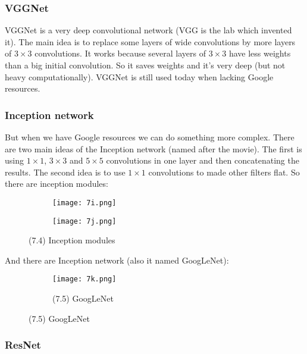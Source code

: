 \subsubsection*{VGGNet}

VGGNet is a very deep convolutional network (VGG is the lab which invented it). The main idea is to replace some layers of wide convolutions by more layers of $3\times3$ convolutions. It works because several layers of $3\times3$ have less weights than a big initial convolution. So it saves weights and it's very deep (but not heavy computationally). VGGNet is still used today when lacking Google resources.

\subsubsection*{Inception network}

But when we have Google resources we can do something more complex. There are two main ideas of the Inception network (named after the movie). The first is using $1\times1$, $3\times3$ and $5\times5$ convolutions in one layer and then concatenating the results. The second idea is to use $1\times1$ convolutions to made other filters flat. So there are inception modules:\\
\begin{figure}[h]
  \centering
  \begin{subfigure}[l]{0.4\linewidth}
    \texttt{[image: 7i.png]}
  \end{subfigure}
  \hspace{0.5cm}
  \begin{subfigure}[r]{0.4\linewidth}
    \texttt{[image: 7j.png]}
  \end{subfigure}
  \caption*{(7.4) Inception modules}
\end{figure}
And there are Inception network (also it named GoogLeNet):
\begin{figure}[h]
  \centering
  \begin{subfigure}[c]{0.7\linewidth}
    \texttt{[image: 7k.png]}
    \caption*{(7.5) GoogLeNet}
  \end{subfigure}
\end{figure}

\vspace{-0.5cm}
\subsubsection*{ResNet}

